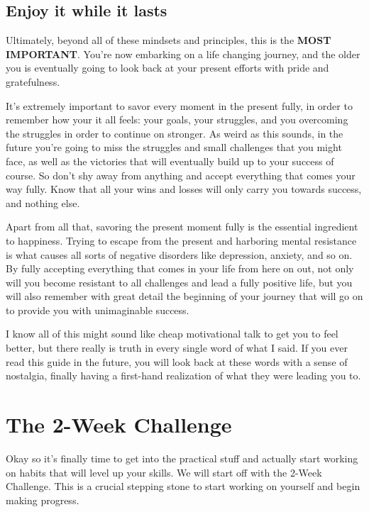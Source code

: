 \documentclass[
]{book}
\begin{document}
\hypertarget{enjoy-it-while-it-lasts}{%
\section{Enjoy it while it lasts}\label{enjoy-it-while-it-lasts}}

Ultimately, beyond all of these mindsets and principles, this is the \textbf{MOST IMPORTANT}. You're now embarking on a life changing journey, and the older you is eventually going to look back at your present efforts with pride and gratefulness.

It's extremely important to savor every moment in the present fully, in order to remember how your it all feels: your goals, your struggles, and you overcoming the struggles in order to continue on stronger. As weird as this sounds, in the future you're going to miss the struggles and small challenges that you might face, as well as the victories that will eventually build up to your success of course. So don't shy away from anything and accept everything that comes your way fully. Know that all your wins and losses will only carry you towards success, and nothing else.

Apart from all that, savoring the present moment fully is the essential ingredient to happiness. Trying to escape from the present and harboring mental resistance is what causes all sorts of negative disorders like depression, anxiety, and so on. By fully accepting everything that comes in your life from here on out, not only will you become resistant to all challenges and lead a fully positive life, but you will also remember with great detail the beginning of your journey that will go on to provide you with unimaginable success.

I know all of this might sound like cheap motivational talk to get you to feel better, but there really is truth in every single word of what I said. If you ever read this guide in the future, you will look back at these words with a sense of nostalgia, finally having a first-hand realization of what they were leading you to.

\hypertarget{the-2-week-challenge}{%
\chapter{The 2-Week Challenge}\label{the-2-week-challenge}}

Okay so it's finally time to get into the practical stuff and actually start working on habits that will level up your skills. We will start off with the 2-Week Challenge. This is a crucial stepping stone to start working on yourself and begin making progress.
\end{document}
